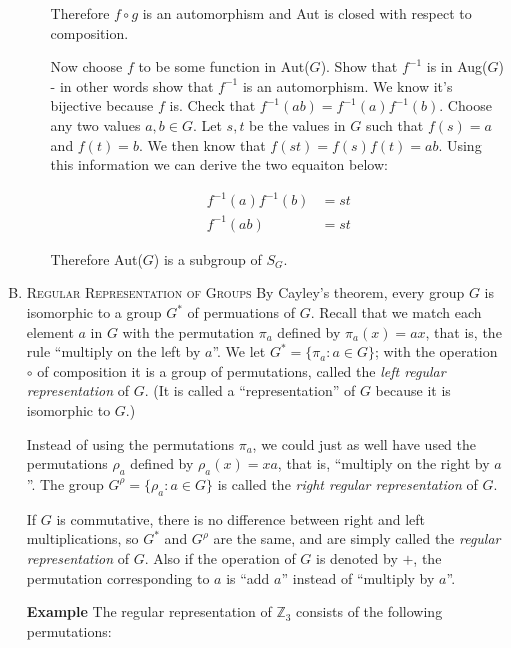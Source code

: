 \documentclass[twoside]{amsart}
\newcommand{\Integers}{\ensuremath{\mathbb{Z}{}}\xspace}
\newcommand{\blank}{\vspace{5pt}}
\begin{document}
\begin{enumerate}[A.]
\begin{enumerate}[1]
      Therefore $f \circ g$ is an automorphism and Aut is closed with
      respect to composition.


      Now choose $f$ to be some function in Aut($G$). Show that
      $f^{-1}$ is in Aug($G$) - in other words show that $f^{-1}$
      is an automorphism. We know it's bijective because $f$ is.
      Check that $f^{-1}(ab) = f^{-1}(a)f^{-1}(b)$. Choose
      any two values $a,b \in G$. Let $s,t$
      be the values in $G$ such that 
      $f(s)=a$ and $f(t)=b$. We then know that $f(st)=f(s)f(t)=ab$.
      Using this information we can derive the two equaiton below:

      \setcounter{equation}{0}
      \begin{align}
         f^{-1}(a)f^{-1}(b) &= st \\
         f^{-1}(ab) &= st 
      \end{align}

      Therefore Aut($G$) is a subgroup of $S_G$.
      
   \end{enumerate}

   \blank
   \item \textsc{Regular Representation of Groups}
   By Cayley's theorem, every group $G$ is isomorphic to a group $G^*$ of
   permuations of $G$. Recall that we match each element $a$ in $G$ with
   the permutation $\pi_a$ defined by $\pi_a(x)=ax$, that is, the rule
   ``multiply on the left by $a$''. We let $G^* = \{\pi_a : a \in G\}$;
   with the operation $\circ$ of composition it is a group of permutations,
   called the \emph{left regular representation} of $G$. (It is called a
   ``representation'' of $G$ because it is isomorphic to $G$.)

   Instead of using the permutations $\pi_a$, we could just as well have used
   the permutations $\rho_a$ defined by $\rho_a(x)=xa$, that is, 
   ``multiply on the right by $a$''. The group $G^\rho = \{ \rho_a :
   a \in G\}$ is called the \emph{right regular representation} of $G$.

   If $G$ is commutative, there is no difference between right and left
   multiplications, so $G^*$ and $G^\rho$ are the same, and are simply
   called the \emph{regular representation} of $G$. Also if the operation of
   $G$ is denoted by $+$, the permutation corresponding to $a$ is
   ``add $a$'' instead of ``multiply by $a$''.

   \textbf{Example} The regular representation of $\Integers_3$ consists
   of the following permutations:


\end{enumerate}
\end{document}
